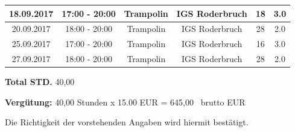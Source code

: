 \documentclass[a4paper,10pt,BCOR=0mm]{scrreprt}
\begin{document}
\begin{flushright}
\begin{tabular}{|c|c|c|c|c|c|}
18.09.2017
&
17:00 - 20:00
&
Trampolin
&
IGS Roderbruch
&
18
&
3.0
\\\hline


20.09.2017
&
18:00 - 20:00
&
Trampolin
&
IGS Roderbruch
&
28
&
2.0
\\\hline


25.09.2017
&
17:00 - 20:00
&
Trampolin
&
IGS Roderbruch
&
16
&
3.0
\\\hline


27.09.2017
&
18:00 - 20:00
&
Trampolin
&
IGS Roderbruch
&
28
&
2.0
\\\hline



\end{tabular} 
\begin{flushright}
\parbox{5cm}{\textbf{Total STD.} 40,00}\end{flushright}
\hfill\hfill \textbf{Vergütung:} 40,00 Stunden x 15.00 EUR = 645,00 \officialeuro\  brutto EUR \hspace*{2cm}\\
\end{flushright}
\vfill
Die Richtigkeit der vorstehenden Angaben wird hiermit bestätigt.\\
\end{document}
